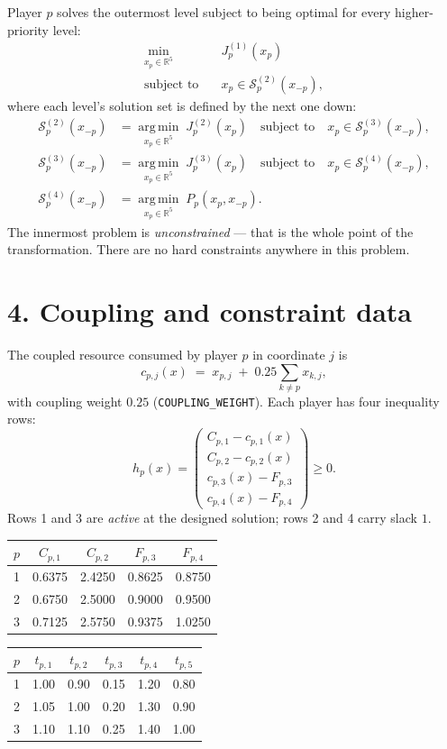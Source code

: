 \documentclass[11pt]{article}
\newcommand{\argmin}{\operatorname*{arg\,min}}
\begin{document}
Player \(p\) solves the outermost level subject to being optimal for every higher-priority
level:
\[
\begin{aligned}
  \min_{x_p \in \mathbb{R}^5} \quad & J_p^{(1)}(x_p) \\
  \text{subject to} \quad & x_p \in \mathcal{S}_p^{(2)}(x_{-p}),
\end{aligned}
\]
where each level's solution set is defined by the next one down:
\[
\begin{aligned}
  \mathcal{S}_p^{(2)}(x_{-p}) &= \argmin_{x_p \in \mathbb{R}^5} \; J_p^{(2)}(x_p)
    \quad \text{subject to} \quad x_p \in \mathcal{S}_p^{(3)}(x_{-p}), \\
  \mathcal{S}_p^{(3)}(x_{-p}) &= \argmin_{x_p \in \mathbb{R}^5} \; J_p^{(3)}(x_p)
    \quad \text{subject to} \quad x_p \in \mathcal{S}_p^{(4)}(x_{-p}), \\
  \mathcal{S}_p^{(4)}(x_{-p}) &= \argmin_{x_p \in \mathbb{R}^5} \; P_p(x_p, x_{-p}).
\end{aligned}
\]
The innermost problem is \emph{unconstrained} --- that is the whole point of the
transformation. There are no hard constraints anywhere in this problem.

\section*{4. Coupling and constraint data}

The coupled resource consumed by player \(p\) in coordinate \(j\) is
\[
  c_{p,j}(x) \;=\; x_{p,j} \;+\; 0.25 \sum_{k \neq p} x_{k,j},
\]
with coupling weight \(0.25\) (\texttt{COUPLING\_WEIGHT}). Each player has four inequality rows:
\[
  h_p(x) =
  \begin{pmatrix}
    C_{p,1} - c_{p,1}(x) \\
    C_{p,2} - c_{p,2}(x) \\
    c_{p,3}(x) - F_{p,3} \\
    c_{p,4}(x) - F_{p,4}
  \end{pmatrix} \ge 0 .
\]
Rows 1 and 3 are \emph{active} at the designed solution; rows 2 and 4 carry slack \(1\).

\begin{center}
\begin{tabular}{ccccc}
  \toprule
  \(p\) & \(C_{p,1}\) & \(C_{p,2}\) & \(F_{p,3}\) & \(F_{p,4}\) \\
  \midrule
  1 & 0.6375 & 2.4250 & 0.8625 & 0.8750 \\
  2 & 0.6750 & 2.5000 & 0.9000 & 0.9500 \\
  3 & 0.7125 & 2.5750 & 0.9375 & 1.0250 \\
  \bottomrule
\end{tabular}
\qquad
\begin{tabular}{cccccc}
  \toprule
  \(p\) & \(t_{p,1}\) & \(t_{p,2}\) & \(t_{p,3}\) & \(t_{p,4}\) & \(t_{p,5}\) \\
  \midrule
  1 & 1.00 & 0.90 & 0.15 & 1.20 & 0.80 \\
  2 & 1.05 & 1.00 & 0.20 & 1.30 & 0.90 \\
  3 & 1.10 & 1.10 & 0.25 & 1.40 & 1.00 \\
  \bottomrule
\end{tabular}
\end{center}
\end{document}
